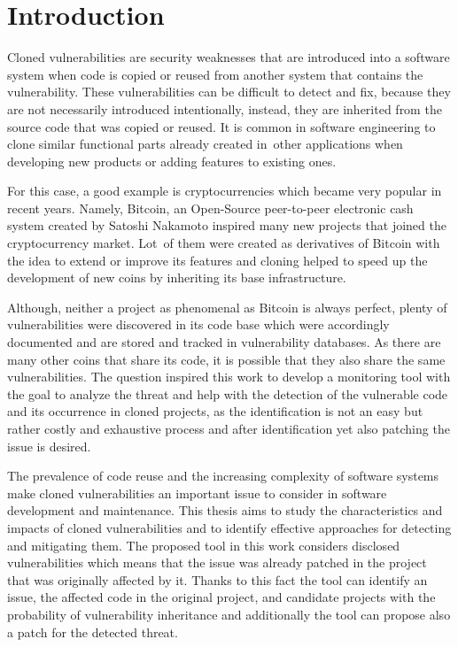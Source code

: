 
\chapter{Introduction}
  Cloned vulnerabilities are security weaknesses that are introduced into a software system
  when code is copied or reused from another system that contains the vulnerability.
  These vulnerabilities can be difficult to detect and fix, because they are not necessarily introduced
  intentionally, instead, they are inherited from the source code that was copied or reused. It is common
  in software engineering to clone similar functional parts already created in~other applications when
  developing new products or adding features to existing ones.

  For this case, a good example is cryptocurrencies which became very popular in recent years.
  Namely, Bitcoin, an Open-Source peer-to-peer electronic cash system created by Satoshi Nakamoto
  \cite{bitcoin} inspired many new projects that joined the cryptocurrency market. Lot~of them were created
  as derivatives of Bitcoin with the idea to extend or improve its features and cloning helped to speed up
  the development of new coins by inheriting its base infrastructure.

  Although, neither a project as phenomenal as Bitcoin is always perfect, plenty of vulnerabilities were
  discovered in its code base which were accordingly documented and are stored and tracked in vulnerability
  databases. As there are many other coins that share its code, it is possible that they also share
  the same vulnerabilities. The question inspired this work to develop a monitoring tool with the goal
  to analyze the threat and help with the detection of the vulnerable code and its occurrence in
  cloned projects, as the identification is not an easy but rather costly and exhaustive process
  and after identification yet also patching the issue is desired.

  The prevalence of code reuse and the increasing complexity of software systems make cloned vulnerabilities
  an important issue to consider in software development and maintenance. This thesis aims to study the
  characteristics and impacts of cloned vulnerabilities and to identify effective approaches for detecting
  and mitigating them. The proposed tool in this work considers disclosed vulnerabilities which means
  that the issue was already patched in the project that was originally affected by it. Thanks to this fact
  the tool can identify an issue, the affected code in the original project, and candidate projects with
  the probability of vulnerability inheritance and additionally the tool can propose also a patch for
  the detected threat.

